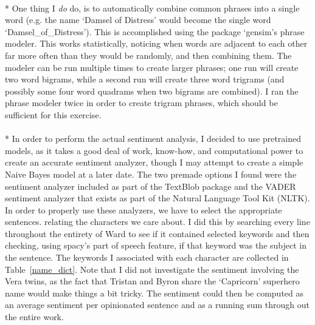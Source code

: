 \documentclass[11pt]{article}
\begin{document}
\\*
One thing I \emph{do} do, is to automatically combine common phrases into a single word (e.g. the name `Damsel of Distress' would become the single word `Damsel\_of\_Distress'). This is accomplished using the package `gensim's phrase modeler. This works statistically, noticing when words are adjacent to each other far more often than they would be randomly, and then combining them. The modeler can be run multiple times to create larger phrases; one run will create two word bigrams, while a second run will create three word trigrams (and possibly some four word quadrams when two bigrams are combined). I ran the phrase modeler twice in order to create trigram phrases, which should be sufficient for this exercise. 
\\
\\*
In order to perform the actual sentiment analysis, I decided to use pretrained models, as it takes a good deal of work, know-how, and computational power to create an accurate sentiment analyzer, though I may attempt to create a simple Naive Bayes model at a later date. The two premade options I found were the sentiment analyzer included as part of the TextBlob package and the VADER sentiment analyzer that exists as part of the Natural Language Tool Kit (NLTK). In order to properly use these analyzers, we have to select the appropriate sentences. relating the characters we care about. I did this by searching every line throughout the entirety of Ward to see if it contained selected keywords and then checking, using spacy's part of speech feature, if that keyword was the subject in the sentence. The keywords I associated with each character are collected in Table~\ref{name_dict}. Note that I did not investigate the sentiment involving the Vera twins, as the fact that Tristan and Byron share the `Capricorn' superhero name would make things a bit tricky. The sentiment could then be computed as an average sentiment per opinionated sentence and as a running sum through out the entire work.
\end{document}
